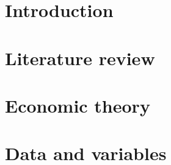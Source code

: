 























%








\maketitle

\thispagestyle{empty}

\clearpage

\pagestyle{scrheadings}

\small {
}
\clearpage
\normalsize

\section{Introduction}


\section{Literature review}


\section{Economic theory}

\clearpage
\section{Data and variables}


